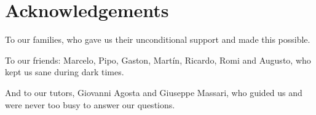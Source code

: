 \chapter*{Acknowledgements}

To our families, who gave us their unconditional support and made this possible.

To our friends: Marcelo, Pipo, Gaston, Martín, Ricardo, Romi and Augusto, who kept us sane during dark times.

And to our tutors, Giovanni Agosta and Giuseppe Massari, who guided us and were never too busy to answer our questions.
